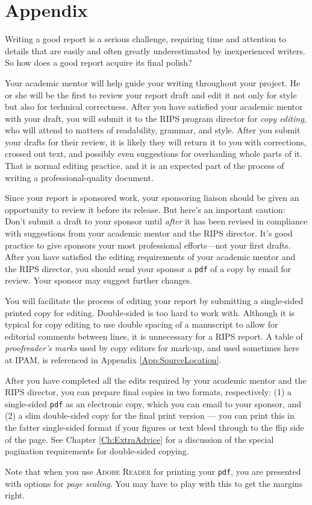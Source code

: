 \chapter{Appendix}\label{Ch:Polishing}

Writing a good report is a serious challenge, requiring time and attention to details that are easily and often greatly underestimated by inexperienced writers.
So how does a good report acquire its final polish?

Your academic mentor will help guide your writing throughout your project.
He or she will be the first to review your report draft and edit it not only for style but also for technical correctness.
After you have satisfied your academic mentor with your draft, you will submit it to the RIPS program director for \emph{copy editing}, who will attend to matters of readability, grammar, and style.
After you submit your drafts for their review, it is likely they will return it to you with corrections, crossed out text, and possibly even suggestions
for overhauling whole parts of it. 
That is normal editing practice, and it is an expected part of the process of writing a professional-quality document.

Since your report is sponsored work, your sponsoring liaison should be given an opportunity to review it before its release.
But here's an important caution:  Don't submit a draft to your sponsor until 
\emph{after} it has been revised in compliance with suggestions from your academic mentor and the RIPS director.
It's good practice to give sponsors your most professional efforts---not your first drafts.
After you have satisfied the editing requirements of your academic mentor and the RIPS director, you should send your sponsor a \texttt{pdf} of a copy by email for review.
Your sponsor may suggest further changes.

\vspace{12pt}
\noindent You will facilitate the process of editing your report by submitting a single-sided printed copy for editing.
Double-sided is too hard to work with.
Although it is typical for copy editing to use double spacing of a manuscript to allow for editorial comments between lines, it is unnecessary for a RIPS report.
A table of {\em proofreader's marks} used by copy editors for mark-up, and used sometimes here at IPAM, is referenced in Appendix \ref{App:SourceLocation}.

After you have completed all the edits required by your academic mentor and the RIPS director, you can prepare final copies in two formats, respectively:
(1) a single-sided \texttt{pdf} as an electronic copy, which you can email to your sponsor, and 
(2) a slim double-sided copy for the final print version --- you can print this in the fatter single-sided format if your figures or text bleed through to the flip side of the page.
See Chapter \ref{Ch:ExtraAdvice} for a discussion of the special pagination requirements for double-sided copying.

Note that when you use \textsc{Adobe Reader} for printing your \texttt{pdf}, you are presented with options for {\em page scaling}.  You may have to play with this to get the  margins right.


\endinput
